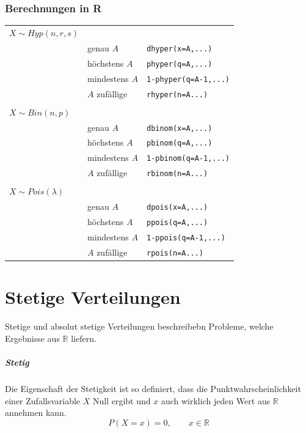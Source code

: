 \subsection{Berechnungen in R}

\begin{table}[h!]
	\begin{tabular}{l l l}
	$X \sim Hyp(n,r,s)$ & & \\ %
		& genau $A$ 		& \verb!dhyper(x=A,...)! \\
		& höchstens $A$		& \verb!phyper(q=A,...)! \\
		& mindestens $A$	& \verb!1-phyper(q=A-1,...)! \\
		& $A$ zufällige 	& \verb!rhyper(n=A...)! \\
	& & \\
	$X \sim Bin(n,p)$ & & \\ %
		& genau $A$		& \verb!dbinom(x=A,...)! \\
		& höchstens $A$		& \verb!pbinom(q=A,...)! \\
		& mindestens $A$	& \verb!1-pbinom(q=A-1,...)! \\
		& $A$ zufällige 	& \verb!rbinom(n=A...)! \\
	& & \\
	$X \sim Pois(\lambda)$ & & \\ %
		& genau $A$		& \verb!dpois(x=A,...)! \\
		& höchstens $A$		& \verb!ppois(q=A,...)! \\
		& mindestens $A$	& \verb!1-ppois(q=A-1,...)! \\
		& $A$ zufällige 	& \verb!rpois(n=A...)! \\
	\end{tabular}
\end{table}

\chapter{Stetige Verteilungen}
Stetige und absolut stetige Verteilungen beschreibebn Probleme, 
welche Ergebnisse aus $\mathbb{R}$ liefern.

\paragraph{Stetig} Die Eigenschaft der Stetigkeit ist so definiert,
dass die Punktwahrscheinlichkeit einer Zufallsvariable 
$X$ Null ergibt und $x$ auch wirklich jeden Wert aus
$\mathbb{R}$ annehmen kann.
\[ 
	P(X=x) = 0, \qquad x\in\mathbb{R}
\]
